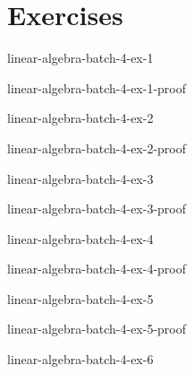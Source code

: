 \documentclass[preview]{standalone}
\begin{document}
\genpage

\section{Exercises}

\begin{snippetexercise}{linear-algebra-batch-4-ex-1}{}
    \todo
\end{snippetexercise}

\begin{snippetsolution}{linear-algebra-batch-4-ex-1-proof}{}
    \todo
\end{snippetsolution}

\begin{snippetexercise}{linear-algebra-batch-4-ex-2}{}
    \todo
\end{snippetexercise}

\begin{snippetsolution}{linear-algebra-batch-4-ex-2-proof}{}
    \todo
\end{snippetsolution}

\begin{snippetexercise}{linear-algebra-batch-4-ex-3}{}
    \todo
\end{snippetexercise}

\begin{snippetsolution}{linear-algebra-batch-4-ex-3-proof}{}
    \todo
\end{snippetsolution}

\begin{snippetexercise}{linear-algebra-batch-4-ex-4}{}
    \todo
\end{snippetexercise}

\begin{snippetsolution}{linear-algebra-batch-4-ex-4-proof}{}
    \todo
\end{snippetsolution}

\begin{snippetexercise}{linear-algebra-batch-4-ex-5}{}
    \todo
\end{snippetexercise}

\begin{snippetsolution}{linear-algebra-batch-4-ex-5-proof}{}
    \todo
\end{snippetsolution}

\begin{snippetexercise}{linear-algebra-batch-4-ex-6}{}
    \todo
\end{snippetexercise}
\end{document}
